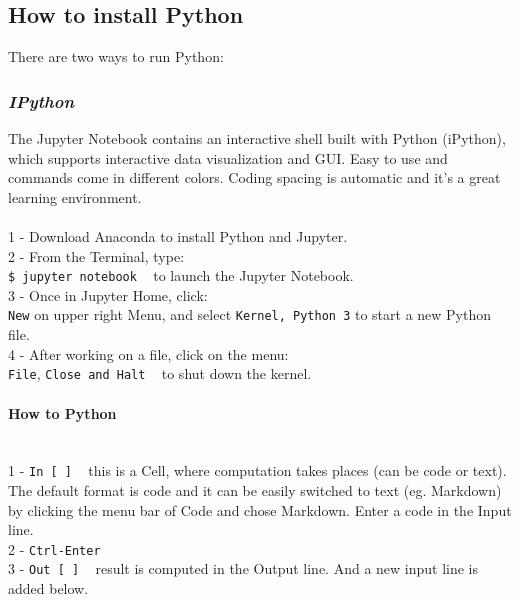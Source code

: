 \documentclass{article}
\begin{document}
\subsection{How to install Python}
There are two ways to run Python:
\subsubsection{\small\textsl{IPython }}

The Jupyter Notebook contains an interactive shell built with Python (iPython), which supports interactive data visualization and GUI. Easy to use and commands come in different colors. Coding spacing is automatic and it's a great learning environment.\\
\\
1 - Download Anaconda to install Python and Jupyter. \\
2 - From the Terminal, type:\\
\texttt{\$ jupyter notebook} ~ to launch the Jupyter Notebook.\\
3 - Once in Jupyter Home, click:\\
\texttt{New} on upper right Menu, and select \texttt{Kernel, Python 3} to start a new Python file.\\
4 - After working on a file, click on the menu: \\
\texttt{File}, \texttt{Close and Halt} ~ to shut down the kernel.

\paragraph{\textbf{How to Python}}\\
1 - \texttt{In [~]} ~ this is a Cell, where computation takes places (can be code or text). The default format is code and it can be easily switched to text (eg. Markdown) by clicking the menu bar of Code and chose Markdown. Enter a code in the Input line.\\
2 - \texttt{Ctrl-Enter} \\
3 - \texttt{Out [~]} ~ result is computed in the Output line. And a new input line is added below. 
\end{document}
